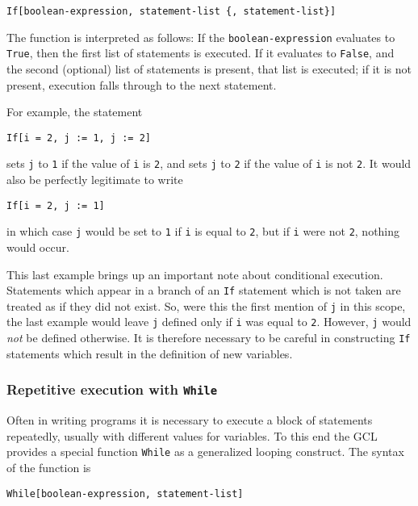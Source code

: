 \begin{verbatim}
If[boolean-expression, statement-list {, statement-list}]
\end{verbatim}

\noindent The function is interpreted as follows: If the 
\verb+boolean-expression+ evaluates to \verb+True+, then the first
list of statements is executed.  If it evaluates to \verb+False+,
and the second (optional) list of statements is present, that list
is executed; if it is not present, execution falls through to the
next statement.

For example, the statement

\begin{verbatim}
If[i = 2, j := 1, j := 2]
\end{verbatim}

\noindent sets \verb+j+ to \verb+1+ if the value of \verb+i+ is \verb+2+,
and sets \verb+j+ to \verb+2+ if the value of \verb+i+ is not \verb+2+.
It would also be perfectly legitimate to write

\begin{verbatim}
If[i = 2, j := 1]
\end{verbatim}

\noindent in which case \verb+j+ would be set to \verb+1+ if \verb+i+
is equal to \verb+2+, but if \verb+i+ were not \verb+2+, nothing would
occur.

This last example brings up an important note about conditional
execution.  Statements which appear in a branch of an \verb+If+
statement which is not taken are treated as if they did not exist.
So, were this the first mention of \verb+j+ in this scope, the last
example would leave \verb+j+ defined only if \verb+i+ was equal to
\verb+2+.  However, \verb+j+ would {\em not} be defined otherwise.  It
is therefore necessary to be careful in constructing \verb+If+
statements which result in the definition of new variables.

\subsubsection{Repetitive execution with {\tt While}}

Often in writing programs it is necessary to execute a block of statements
repeatedly, usually with different values for variables.  To this end
the GCL provides a special function \verb+While+ as a generalized looping
construct.  The syntax of the function is

\begin{verbatim}
While[boolean-expression, statement-list]
\end{verbatim}

